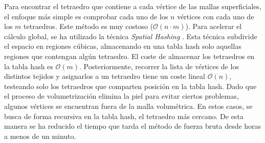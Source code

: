 Para encontrar el tetraedro que contiene a cada vértice de las mallas superficiales, el enfoque más simple es comprobar cada uno de los $n$ vértices con cada uno de los $m$ tetraedros. 
%
Este método es muy costoso ($\mathcal{O}(n \cdot m)$). Para acelerar el cálculo global, se ha utilizado la técnica \emph{Spatial Hashing} \cite{Teschner2003}. Esta técnica subdivide el espacio en regiones cúbicas, almacenando en una \ac{tabla hash} solo aquellas regiones que contengan algún tetraedro. El coste de almacenar los tetraedros en la \ac{tabla hash} es $\mathcal{O}(m)$. Posteriormente, recorrer la lista de vértices de los distintos tejidos y asignarlos a un tetraedro tiene un coste lineal $\mathcal{O}(n)$, testeando solo los tetraedros que comparten posición en la \ac{tabla hash}. Dado que el proceso de volumetrización elimina la piel para evitar ciertos problemas, algunos vértices se encuentran fuera de la malla volumétrica. En estos casos, se busca de forma recursiva en la \ac{tabla hash}, el tetraedro más cercano.
De esta manera se ha reducido el tiempo que tarda el método de fuerza bruta desde horas a menos de un minuto.





